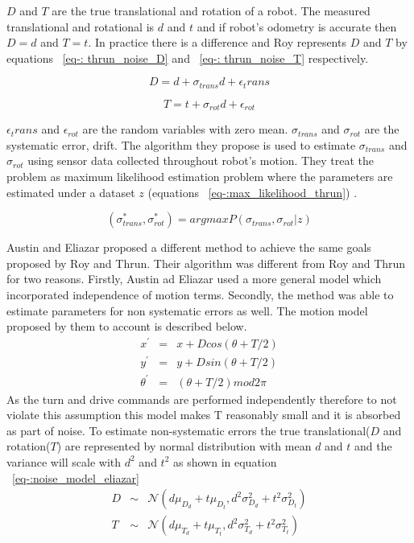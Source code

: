 \documentclass[12pt,draft]{dalcsthesis}
\begin{document}
$D$ and $T$ are the true translational and rotation of a robot. The measured translational and rotational is $d$ and $t$ and if robot's odometry is accurate then $D=d$ and $T=t$. In practice there is a difference and Roy represents $D$ and $T$ by equations ~\ref{eq-: thrun_noise_D} and ~\ref{eq-: thrun_noise_T} respectively.

\begin{equation}
\label{eq-: thrun_noise_D}
D= d+ \sigma_{trans}d+\epsilon_trans
\end{equation}

\begin{equation}
\label{eq-: thrun_noise_T}
  T= t+ \sigma_{rot}d+\epsilon_{rot}
\end{equation}

$\epsilon_trans$ and $\epsilon_{rot}$ are the random variables with zero mean. $\sigma_{trans}$ and $\sigma_{rot}$ are the systematic error, drift.  The algorithm they propose is used to estimate $\sigma_{trans}$ and $\sigma_{rot}$ using sensor data collected throughout robot's motion. They treat the problem as maximum likelihood estimation problem where the parameters are estimated under a dataset $z$ (equations ~\ref{eq-:max_likelihood_thrun}) .

\begin{equation}
\label{eq-:max_likelihood_thrun}
 (\sigma_{trans}^{*},\sigma_{rot}^{*}) = argmax P(\sigma_{trans},\sigma_{rot}|z)
\end{equation}

Austin and Eliazar \cite{Eliazar2004} proposed a different method to achieve the same goals proposed by Roy and Thrun. Their algorithm was different from Roy and Thrun for two reasons. Firstly, Austin ad Eliazar used a more general model which incorporated independence of motion terms. Secondly, the method was able to estimate parameters for non systematic errors as well. 
The motion model proposed by them to account is described below.
\begin{equation}
	\begin{aligned}
	x^{'}&=&x+Dcos(\theta+T/2) \\
	y^{'}&=&y+Dsin(\theta+T/2) \\
	\theta^{'}&=&(\theta+T/2)mod2\pi
	\end{aligned}
\end{equation}
As the turn and drive commands are performed independently therefore to not violate this assumption this model makes T reasonably small and it is absorbed as part of noise. To estimate non-systematic errors the true translational($D$ and rotation($T$) are represented by normal distribution with mean $d$ and $t$ and the variance will scale with $d^2$ and $t^2$ as shown in equation ~\ref{eq-:noise_model_eliazar}
\begin{equation}
\label{eq-:noise_model_eliazar}
\begin{aligned}
D &\sim& \mathcal{{N}}(d\mu_{D_{d}}+t\mu_{D_{t}},d^2\sigma_{D_{d}}^2+t^2\sigma_{D_{t}}^2)\\
T &\sim& \mathcal{{N}}(d\mu_{T_{d}}+t\mu_{T_{t}},d^2\sigma_{T_{d}}^2+t^2\sigma_{T_{t}}^2)
\end{aligned}
\end{equation}
\end{document}
